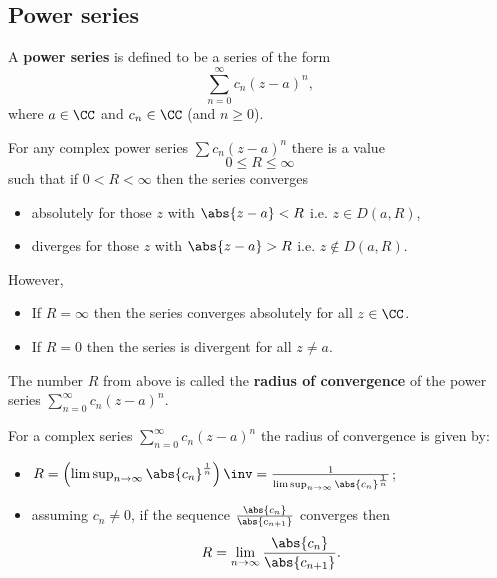 \documentclass[12pt, a4paper]{article}
\begin{document}
\subsection{Power series}

\begin{definition}
    A \textbf{power series} is defined to be a series of the form 
    \[\sum_{n=0}^{\infty} c_n(z-a)^n,\]
    where \(a \in \CC\) and \(c_n \in \CC\) (and \(n\geq 0\)).
\end{definition}

\begin{mdprop}
    For any complex power series \(\sum c_n (z-a)^n\) there is a value 
    \[0 \leq R \leq \infty\]
    such that if \(0 < R < \infty\) then the series converges 
    \begin{itemize}
        \item absolutely for those \(z\) with \(\abs{z-a}<R\) i.e. \(z \in D(a,R)\),
        \item diverges for those \(z\) with \(\abs{z-a} >R\) i.e. \(z \not\in D(a,R)\).
    \end{itemize}
    However, 
    \begin{itemize}
        \item If \(R = \infty\) then the series converges absolutely for all \(z \in \CC\).
        \item If \(R=0\) then the series is divergent for all \(z \neq a\).
    \end{itemize}
\end{mdprop}

\begin{definition}
    The number \(R\) from above is called the \textbf{radius of convergence} of the power series \(\sum_{n=0}^{\infty} c_n(z-a)^n\).
\end{definition}

\begin{mdprop}
    For a complex series \(\sum_{n=0}^{\infty} c_n (z-a)^n\) the radius of convergence is given by:
    \begin{itemize}
        \item \(R = \left( \limsup_{n \to \infty} \abs{c_n}^{\frac{1}{n}} \right)\inv =\frac{1}{\limsup_{n \to \infty} \abs{c_n}^{\frac{1}{n}}}\);
        \item assuming \(c_n \neq 0\), if the sequence \(\frac{\abs{c_n}}{\abs{c_{n+1}}}\) converges then 
        \[R = \lim_{n \to \infty} \frac{\abs{c_n}}{\abs{c_{n+1}}}.\]
    \end{itemize}
\end{mdprop}
\end{document}
